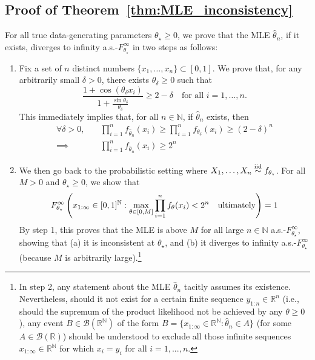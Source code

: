 \documentclass[11pt,twoside]{article}
\newcommand{\iid}{\overset{\textnormal{iid}}{\sim}}
\def\RR{\mathbb{R}}
\def\NN{\mathbb{N}}
\begin{document}
\subsection*{Proof of Theorem~\ref{thm:MLE_inconsistency}} %

For all true data-generating parameters $\theta_\star\geq 0$, we prove that the MLE $\hat\theta_n$, if it exists, diverges to infinity a.s.-$F_{\theta_\star}^{\infty}$ in two steps as follows:
%
\begin{enumerate}
    \item Fix a set of $n$ distinct numbers $\{x_1, \dots, x_n\}\subset [0,1]$. We prove that, for any arbitrarily small $\delta>0$, there exists $\theta_\delta\geq 0$ such that
    \[
    \frac{1+\cos(\theta_\delta x_i)}{1+\frac{\sin\theta_\delta}{\theta_\delta}} \ge 2-\delta \quad \text{for all } i = 1,\dots, n.
    \]
    This immediately implies that, for all $n\in\mathbb N$, if $\hat\theta_n$ exists, then
    \begin{align*}
        \forall \delta>0, & \quad \prod_{i=1}^n f_{\hat\theta_n}(x_i) \geq \prod_{i=1}^n f_{\theta_\delta}(x_i) \geq (2-\delta)^n \\
        \implies & \quad \prod_{i=1}^n f_{\hat\theta_n}(x_i) \geq 2^n
    \end{align*} \label{step1}

    \item We then go back to the probabilistic setting where $X_1, \dots, X_n\iid f_{\theta_\star}$. For all $M>0$ and $\theta_\star\geq 0$, we show that
    \begin{equation*}
        F_{\theta_\star}^\infty\left(x_{1:\infty} \in[0,1]^\NN :  \max_{\theta\in[0,M]}\prod_{i=1}^n f_{\theta}(x_i) < 2^n \quad \textnormal{ultimately}\right) = 1
    \end{equation*}
    By step 1, this proves that the MLE is above $M$ for all large $n\in\NN$ a.s.-$F_{\theta_\star}^\infty$, showing that (a) it is inconsistent at $\theta_\star$, and (b) it diverges to infinity a.s.-$F_{\theta_\star}^\infty$ (because $M$ is arbitrarily large).\footnote{In step 2, any statement about the MLE $\hat\theta_n$ tacitly assumes its existence. Nevertheless, should it not exist for a certain finite sequence $y_{1:n}\in\RR^n$ (i.e., should the supremum of the product likelihood not be achieved by any $\theta\geq 0$), any event $B\in \mathscr B(\RR^\NN)$ of the form $B=\{x_{1:\infty}\in\RR^\NN : \hat \theta_n\in A\}$ (for some $A\in\mathscr B(\RR)$) should be understood to exclude all those infinite sequences $x_{1:\infty}\in\RR^\NN$ for which $x_i = y_i$ for all $i=1,..., n$.} \label{step2}
\end{enumerate}
\bigskip
\end{document}
